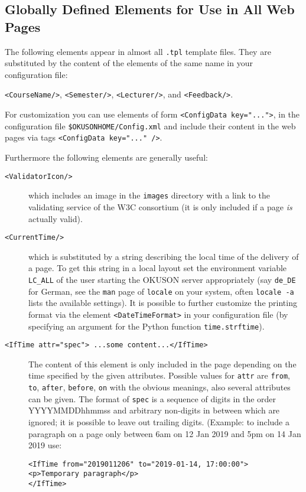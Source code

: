 \documentclass[12pt,openany,a4paper]{book}
\newcommand{\OKUSON}{\textsf{OKUSON}}
\begin{document}
\subsection{Globally Defined Elements for Use in All Web Pages}

The following elements appear in almost all \texttt{.tpl} template files. 
They are substituted 
by the content of the elements of the same name in your configuration file:

\texttt{<CourseName/>}, \texttt{<Semester/>}, \texttt{<Lecturer/>},
and \texttt{<Feedback/>}.

For customization you can use elements of form \texttt{<ConfigData key="...">},
in the configuration file \texttt{\$OKUSONHOME/Config.xml} 
and include their content in the web pages via tags 
\texttt{<ConfigData key="..." />}. 

Furthermore the following elements are generally useful:
\begin{description}
\item[\texttt{<ValidatorIcon/>}] which includes an image in
the \texttt{images} directory with a link to the validating service of the
W3C consortium (it is only included if a page \emph{is} actually valid).
\item[\texttt{<CurrentTime/>}] which is substituted by a string describing
the local time of the delivery of a page. To get this string in a local
layout set the environment variable \verb+LC_ALL+ of the user starting the
{\OKUSON} server appropriately (say \verb+de_DE+ for German, see the
\texttt{man} page of \texttt{locale} on your system, often \texttt{locale
-a} lists the available settings). It is possible to further customize the 
printing format via the element \texttt{<DateTimeFormat>} in your
configuration file (by specifying an argument for the Python function
\texttt{time.strftime}).

\item[\texttt{<IfTime attr="spec"> ...some content...</IfTime>}]
The content of this element is only 
included in the page depending on the time specified by the given attributes. 
Possible values for \texttt{attr} are \texttt{from}, \texttt{to},
\texttt{after}, \texttt{before}, \texttt{on} with the obvious meanings, also
several attributes can be given. 
The format of \texttt{spec} is
a sequence of digits in the order YYYYMMDDhhmmss and arbitrary non-digits in
between which are ignored; it is possible to leave out trailing digits. 
(Example: to include a paragraph on a page only between 6am on 12 Jan 2019 and
5pm on 14 Jan 2019 use:
\begin{verbatim}
<IfTime from="2019011206" to="2019-01-14, 17:00:00">
<p>Temporary paragraph</p>
</IfTime>
\end{verbatim}
\end{description}
\end{document}
